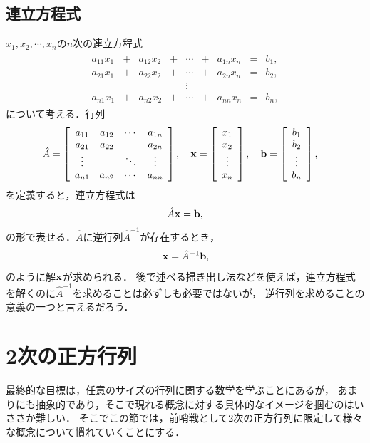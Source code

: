 \subsection{連立方程式}
%
$x_1,x_2,\cdots,x_{n}$の$n$次の連立方程式
%
\begin{align}
\begin{array}{ccccccccc}
a_{11}x_{1} & + & a_{12}x_{2} & + & \cdots & + & a_{1n}x_{n} & = & b_{1},\\
a_{21}x_{1} & + & a_{22}x_{2} & + & \cdots & + & a_{2n}x_{n} & = & b_{2},\\
 &  &  &  & \vdots\\
a_{n1}x_{1} & + & a_{n2}x_{2} & + & \cdots & + & a_{nn}x_{n} & = & b_{n},
\end{array}
\end{align}
について考える．行列
\begin{align}
\hat{A} & =\left[\begin{array}{cccc}
a_{11} & a_{12} & \cdots & a_{1n}\\
a_{21} & a_{22} &  & a_{2n}\\
\vdots &  & \ddots & \vdots\\
a_{n1} & a_{n2} & \cdots & a_{nn}
\end{array}\right],\quad{\bf x}=\left[\begin{array}{c}
x_{1}\\
x_{2}\\
\vdots\\
x_{n}
\end{array}\right],\quad{\bf b}=\left[\begin{array}{c}
b_{1}\\
b_{2}\\
\vdots\\
b_{n}
\end{array}\right],
\end{align}
を定義すると，連立方程式は
\begin{align}
 \hat{A}{\bf x} = {\bf b}, 
\end{align}
の形で表せる．$\hat{A}$に逆行列$\hat{A}^{-1}$が存在するとき，
\begin{align}
 {\bf x} = \hat{A}^{-1}{\bf b}, 
\end{align}
のように解${\bf x}$が求められる．
%
後で述べる掃き出し法などを使えば，連立方程式を解くのに$\hat{A}^{-1}$を求めることは必ずしも必要ではないが，
逆行列を求めることの意義の一つと言えるだろう．
%
\section{2次の正方行列}
%
最終的な目標は，任意のサイズの行列に関する数学を学ぶことにあるが，
あまりにも抽象的であり，そこで現れる概念に対する具体的なイメージを掴むのはいささか難しい．
そこでこの節では，前哨戦として2次の正方行列に限定して様々な概念について慣れていくことにする．
%
